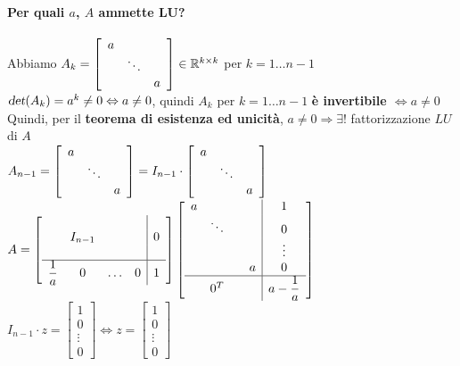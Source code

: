 \documentclass[10pt]{book}
\begin{document}
\paragraph{Per quali $a$, $A$ ammette LU?}  Abbiamo \begin{math}
A_k = \left[ \begin{array}{c c c}
	a & & \\
	& \ddots & \\
	& & a
\end{array} \right] \in \mathbb{R}^{k \times k}
\end{math}
per $k = 1\ldots n-1$\\
$\textsl{det}(A_k) = a^k \neq 0 \Leftrightarrow a \neq 0$, quindi \textbf{$A_k$} per $k = 1\ldots n-1$ \textbf{è invertibile $\Leftrightarrow a \neq 0$}\\
Quindi, per il \textbf{teorema di esistenza ed unicità}, $a \neq 0 \Rightarrow \exists!$ fattorizzazione $LU$ di $A$\\
\begin{math}
A_{n-1} = \left[
\begin{array}{c c c}
	a & & \\
	& \ddots & \\
	& & a
\end{array}
\right] = I_{n-1} \cdot \left[
\begin{array}{c c c}
	a & & \\
	& \ddots & \\
	& & a
\end{array}
\right]
\end{math}\\
\begin{math}
A = \left[ 
\begin{array}{c c c c | c}
 & & & &\\
 & I_{n-1} & & & 0\\
 & & & &\\
 \hline
 \mathlarger{\frac{1}{a}} & 0 & \ldots & 0 & 1
\end{array}
\right] \left[
\begin{array}{c c c c | c}
 a & & & & 1\\
 & \ddots & & & 0\\
 & & & & \vdots \\
 & & & a & 0 \\
 \hline
 & 0^T & & & \mathlarger{a - \frac{1}{a}}
\end{array}
\right]
\end{math}\\
\begin{math}
I_{n-1} \cdot z = \left[ \begin{array}{c} 1\\0\\\vdots\\0\end{array} \right]
\Leftrightarrow
z = \left[ \begin{array}{c} 1\\0\\\vdots\\0\end{array} \right]
\end{math}\\
\end{document}
